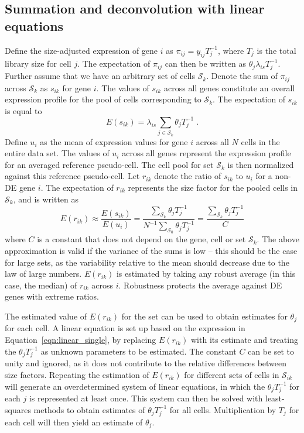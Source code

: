 \documentclass{article}
\begin{document}
\subsection{Summation and deconvolution with linear equations}
Define the size-adjusted expression of gene $i$ as $\pi_{ij} = y_{ij}T_j^{-1}$, where $T_j$ is the total library size for cell $j$.
The expectation of $\pi_{ij}$ can then be written as $\theta_j\lambda_{is} T_j^{-1}$.
Further assume that we have an arbitrary set of cells $\mathcal{S}_k$.
Denote the sum of $\pi_{ij}$ across $\mathcal{S}_k$ as $s_{ik}$ for gene $i$.
The values of $s_{ik}$ across all genes constitute an overall expression profile for the pool of cells corresponding to $\mathcal{S}_k$.
The expectation of $s_{ik}$ is equal to 
\[
    E(s_{ik}) = \lambda_{is} \sum_{j \in \mathcal{S}_k} \theta_j T_j^{-1}\;.
\]
Define $u_{i}$ as the mean of expression values for gene $i$ across all $N$ cells in the entire data set.
The values of $u_{i}$ across all genes represent the expression profile for an averaged reference pseudo-cell.
The cell pool for set $\mathcal{S}_k$ is then normalized against this reference pseudo-cell.
Let $r_{ik}$ denote the ratio of $s_{ik}$ to $u_{i}$ for a non-DE gene $i$.
The expectation of $r_{ik}$ represents the size factor for the pooled cells in $\mathcal{S}_k$, and is written as
\begin{equation}
    E(r_{ik}) \approx \frac{E(s_{ik})}{E(u_{i})} 
    = \frac{\sum_{\mathcal{S}_k} \theta_j T_j^{-1}}{ N^{-1} \sum_{\mathcal{S}_0} \theta_j T_j^{-1}} 
    = \frac{\sum_{\mathcal{S}_k} \theta_j T_j^{-1}}{C}
    \label{eqn:linear_single}
\end{equation}
where $C$ is a constant that does not depend on the gene, cell or set $\mathcal{S}_k$.
The above approximation is valid if the variance of the sums is low -- 
    this should be the case for large sets, as the variability relative to the mean should decrease due to the law of large numbers.
$E(r_{ik})$ is estimated by taking any robust average (in this case, the median) of $r_{ik}$ across $i$.
Robustness protects the average against DE genes with extreme ratios.

The estimated value of $E(r_{ik})$ for the set can be used to obtain estimates for $\theta_j$ for each cell.
A linear equation is set up based on the expression in Equation~\ref{eqn:linear_single}, 
by replacing $E(r_{ik})$ with its estimate and treating the $\theta_j T_j^{-1}$ as unknown parameters to be estimated.
The constant $C$ can be set to unity and ignored, as it does not contribute to the relative differences between size factors.
Repeating the estimation of $E(r_{ik})$ for different sets of cells in $\mathcal{S}_{ik}$ will generate an overdetermined system of linear equations, 
    in which the $\theta_j T_j^{-1}$ for each $j$ is represented at least once.
This system can then be solved with least-squares methods to obtain estimates of $\theta_j T_j^{-1}$ for all cells.
Multiplication by $T_j$ for each cell will then yield an estimate of $\theta_j$.
\end{document}
